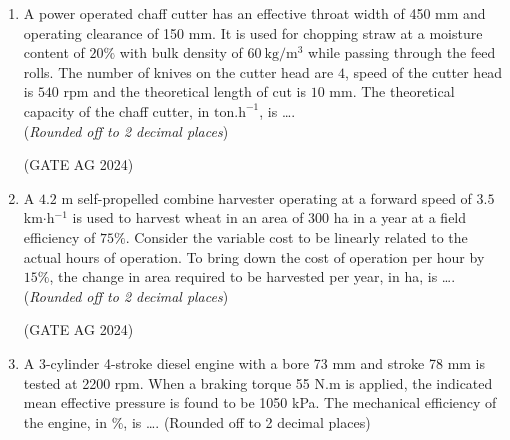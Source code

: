 \documentclass[journal]{IEEEtran}
\begin{document}
\begin{enumerate}
\item 
A power operated chaff cutter has an effective throat width of 450 mm and operating clearance of 150 mm. It is used for chopping straw at a moisture content of $20\%$ with bulk density of $60\ \mathrm{kg/m^3}$ while passing through the feed rolls. The number of knives on the cutter head are $4$, speed of the cutter head is $540$ rpm and the theoretical length of cut is $10$ mm. The theoretical capacity of the chaff cutter, in $\mathrm{ton.h^{-1}}$, is \dots. \\
(\textit{Rounded off to 2 decimal places})
\begin{enumerate}
\end{enumerate}
 \hfill(GATE AG 2024)\\

\medskip

\item 
A $4.2$ m self-propelled combine harvester operating at a forward speed of $3.5$ km$\cdot$h$^{-1}$ is used to harvest wheat in an area of $300$ ha in a year at a field efficiency of $75\%$. Consider the variable cost to be linearly related to the actual hours of operation. To bring down the cost of operation per hour by $15\%$, the change in area required to be harvested per year, in ha, is \dots. \\
(\textit{Rounded off to 2 decimal places})
\begin{enumerate}
\end{enumerate}
 \hfill(GATE AG 2024)\\

\medskip

\item 
{A 3-cylinder 4-stroke diesel engine with a bore 73 mm and stroke 78 mm is tested at 2200 rpm. When a braking torque 55 N.m is applied, the indicated mean effective pressure is found to be 1050 kPa. The mechanical efficiency of the engine, in \%, is \dots. (Rounded off to 2 decimal places)}


\end{enumerate}
\end{document}
